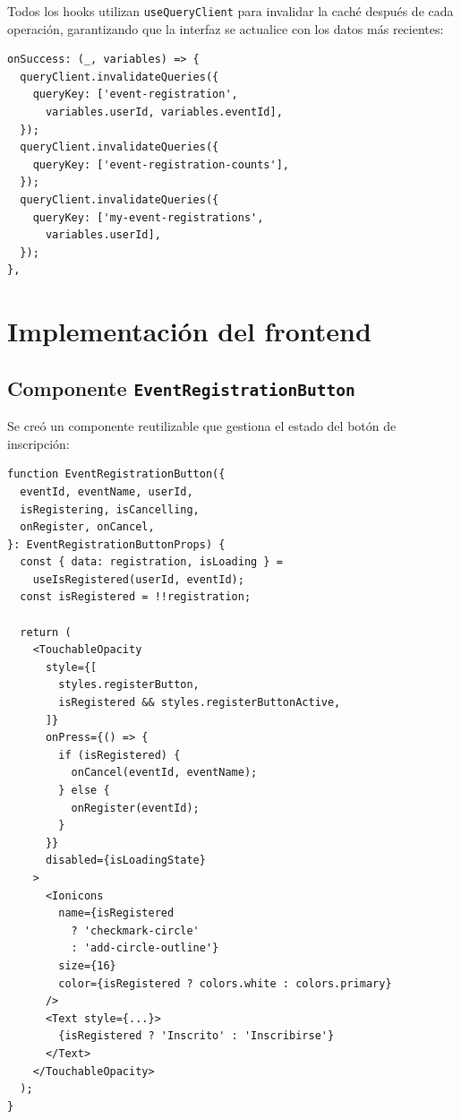 \documentclass[12pt,letterpaper]{article}
\begin{document}
Todos los hooks utilizan \texttt{useQueryClient} para invalidar la
cach\'e despu\'es de cada operaci\'on, garantizando que la interfaz
se actualice con los datos m\'as recientes:

\begin{verbatim}
onSuccess: (_, variables) => {
  queryClient.invalidateQueries({
    queryKey: ['event-registration',
      variables.userId, variables.eventId],
  });
  queryClient.invalidateQueries({
    queryKey: ['event-registration-counts'],
  });
  queryClient.invalidateQueries({
    queryKey: ['my-event-registrations',
      variables.userId],
  });
},
\end{verbatim}

\section{Implementaci\'on del frontend}

\subsection{Componente \texttt{EventRegistrationButton}}

Se cre\'o un componente reutilizable que gestiona el estado del bot\'on
de inscripci\'on:

\begin{verbatim}
function EventRegistrationButton({
  eventId, eventName, userId,
  isRegistering, isCancelling,
  onRegister, onCancel,
}: EventRegistrationButtonProps) {
  const { data: registration, isLoading } =
    useIsRegistered(userId, eventId);
  const isRegistered = !!registration;

  return (
    <TouchableOpacity
      style={[
        styles.registerButton,
        isRegistered && styles.registerButtonActive,
      ]}
      onPress={() => {
        if (isRegistered) {
          onCancel(eventId, eventName);
        } else {
          onRegister(eventId);
        }
      }}
      disabled={isLoadingState}
    >
      <Ionicons
        name={isRegistered
          ? 'checkmark-circle'
          : 'add-circle-outline'}
        size={16}
        color={isRegistered ? colors.white : colors.primary}
      />
      <Text style={...}>
        {isRegistered ? 'Inscrito' : 'Inscribirse'}
      </Text>
    </TouchableOpacity>
  );
}
\end{verbatim}
\end{document}
